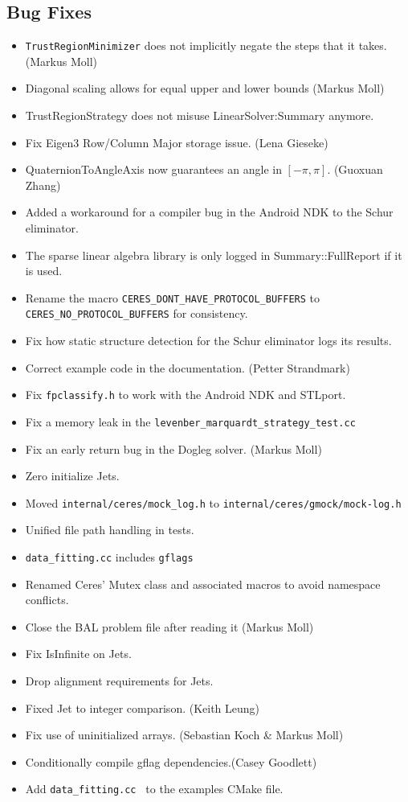 \subsection{Bug Fixes}
\begin{itemize}
\item \texttt{TrustRegionMinimizer} does not implicitly negate the
  steps that it takes. (Markus Moll)
\item Diagonal scaling allows for equal upper and lower bounds (Markus Moll)
\item TrustRegionStrategy does not misuse LinearSolver:Summary anymore.
\item Fix Eigen3 Row/Column Major storage issue. (Lena Gieseke)
\item QuaternionToAngleAxis now guarantees an angle in $[-\pi, \pi]$. (Guoxuan Zhang)
\item Added a workaround for a compiler bug in the Android NDK to the
  Schur eliminator.
\item The sparse linear algebra library is only logged in
  Summary::FullReport if it is used.
\item Rename the macro \texttt{CERES\_DONT\_HAVE\_PROTOCOL\_BUFFERS}
  to \texttt{CERES\_NO\_PROTOCOL\_BUFFERS} for consistency.
\item Fix how static structure detection for the Schur eliminator logs
  its results.
\item Correct example code in the documentation. (Petter Strandmark)
\item Fix \texttt{fpclassify.h} to work with the Android NDK and STLport.
\item Fix a memory leak in the \texttt{levenber\_marquardt\_strategy\_test.cc}
\item Fix an early return bug in the Dogleg solver. (Markus Moll)
\item Zero initialize Jets.
\item Moved \texttt{internal/ceres/mock\_log.h} to \texttt{internal/ceres/gmock/mock-log.h}
\item Unified file path handling in tests.
\item \texttt{data\_fitting.cc} includes \texttt{gflags}
\item Renamed Ceres' Mutex class and associated macros to avoid
  namespace conflicts.
\item Close the BAL problem file after reading it (Markus Moll)
\item Fix IsInfinite on Jets.
\item Drop alignment requirements for Jets.
\item Fixed Jet to integer comparison. (Keith Leung)
\item Fix use of uninitialized arrays. (Sebastian Koch \& Markus Moll)
\item Conditionally compile gflag dependencies.(Casey Goodlett)
\item Add \texttt{data\_fitting.cc } to the examples CMake file.
\end{itemize}


